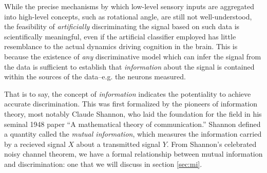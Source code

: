
While the precise mechanisms by which low-level sensory inputs are
aggregated into high-level concepts, such as rotational angle, are
still not well-understood, the feasibility of \emph{artificially}
discriminating the signal based on such data is scientifically
meaningful, even if the artificial classifier employed has little
resemblance to the actual dynamics driving cognition in the brain.  %
This is because the existence of
\emph{any} discriminative model which can infer the signal from the
data is sufficient to establish that \emph{information} about the
signal is contained within the sources of the data--e.g. the neurons
measured.




That is to say, the concept of \emph{information} indicates the
potentiality to achieve accurate discrimination.  This was first
formalized by the pioneers of information theory, most notably Claude
Shannon, who laid the foundation for the field in his seminal 1948
paper ``A mathematical theory of communication.''  Shannon defined a
quantity called the \emph{mutual information}, which measures the
information carried by a recieved signal $X$ about a transmitted
signal $Y$.  From Shannon's celebrated noisy channel theorem, we have
a formal relationship between mutual information and discrimination:
one that we will discuss in section \ref{sec:mi}.


